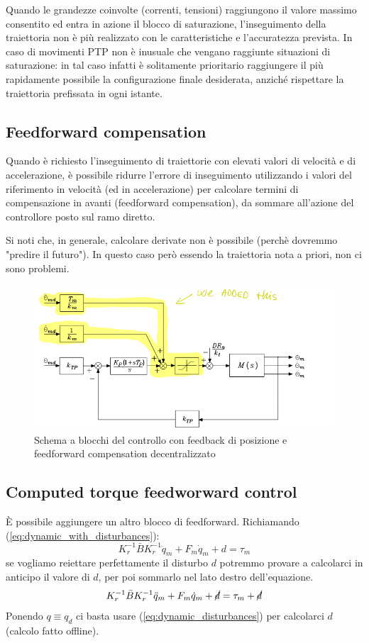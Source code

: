 Quando le grandezze coinvolte (correnti, tensioni) raggiungono il valore massimo consentito ed entra in azione il blocco di saturazione, l’inseguimento della traiettoria non è più realizzato con le caratteristiche e l’accuratezza prevista. In caso di movimenti PTP non è inusuale che vengano raggiunte situazioni di saturazione: in tal caso infatti è solitamente prioritario raggiungere il più rapidamente possibile la configurazione finale desiderata, anziché rispettare la traiettoria prefissata in ogni istante.







\subsection{Feedforward compensation}
Quando è richiesto l’inseguimento di traiettorie con elevati valori di velocità e di accelerazione, è possibile ridurre l’errore di inseguimento utilizzando i valori del riferimento in velocità (ed in accelerazione) per calcolare termini di compensazione in avanti (feedforward compensation), da sommare all’azione del controllore posto sul ramo diretto.

Si noti che, in generale, calcolare derivate non è possibile (perchè dovremmo "predire il futuro"). In questo caso però essendo la traiettoria nota a priori, non ci sono problemi.

\begin{figure}[H]
	\centering
	\includegraphics[width=0.7\linewidth]{images/feedforward_compensation}
	\caption{Schema a blocchi del controllo con feedback di posizione e feedforward compensation decentralizzato}
	\label{fig:feedforwardcompensation}
\end{figure}





\subsection{Computed torque	feedworward control}\label{section:computed_torque}
È possibile aggiungere un altro blocco di feedforward.
Richiamando (\ref{eq:dynamic_with_disturbances}):
\boldmath
$$
K_r^{-1}\bar{B}K_r^{-1}\ddot{q}_m + F_m\dot{q}_m + d = \tau_m
$$
\unboldmath
se vogliamo reiettare perfettamente il disturbo $d$ potremmo provare a calcolarci in anticipo il valore di $d$, per poi sommarlo nel lato destro dell'equazione.
\boldmath
$$
K_r^{-1}\bar{B}K_r^{-1}\ddot{q}_m + F_m\dot{q}_m + \cancel{d} = \tau_m + \cancel{d}
$$
\unboldmath
Ponendo $q\equiv q_d$ ci basta usare (\ref{eq:dynamic_disturbances}) per calcolarci $d$ (calcolo fatto offline).
 
